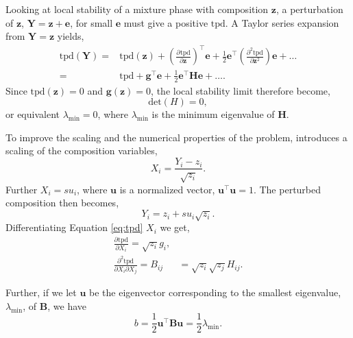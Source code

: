 \documentclass[english]{../thermomemo/thermomemo}
\newcommand*{\pd}[3][]{\frac{\partial^{#1}#2}{\partial{#3}^{#1}}}%
\newcommand*{\vektor}[1]{\boldsymbol{#1}}%
\newcommand{\wrpt}{\text{with respect to~}}
\newcommand{\tpd}{\ensuremath{\text{tpd}}\xspace}
\begin{document}
Looking at local stability of a mixture phase with composition $\vektor{z}$, a
perturbation of $\vektor{z}$, $\vektor{Y} = \vektor{z} + \vektor{e}$, for small $\vektor{e}$ must give a positive
\tpd. A Taylor series expansion from $\vektor{Y}=\vektor{z}$ yields,
\begin{align}
  \tpd(\vektor{Y}) =& \tpd(\vektor{z}) + \left(\pd{\tpd}{\vektor{z}}\right)^\intercal\vektor{e} + \frac{1}{2}\vektor{e}^\intercal\left(\pd[2]{\tpd}{\vektor{z}}\right)\vektor{e} + \dots \\
  =& \tpd + \vektor{g}^\intercal \vektor{e} + \frac{1}{2}\vektor{e}^\intercal\vektor{H}\vektor{e} + \dots.
  \label{eq:tpdTaylor}
\end{align}
Since $\tpd(\vektor{z}) = 0$ and $\vektor{g}(\vektor{z}) = 0$, the local stability limit therefore become,
\begin{equation}
  \text{det}\left(H\right) = 0,
  \label{eq:detM}
\end{equation}
or equivalent $\lambda_{\text{min}} = 0$, where $\lambda_{\text{min}}$
is the minimum eigenvalue of $\vektor{H}$.

To improve the scaling and the numerical properties of the problem,
\citet{Michelsen1984} introduces a scaling of the composition
variables,
\begin{equation}
  \label{eq:X}
  X_i = \frac{Y_i-z_i}{\sqrt{z_i}}.
\end{equation}
Further $X_i = s u_i$, where $\vektor{u}$ is a normalized vector,
$\vektor{u}^\intercal\vektor{u} = 1$. The perturbed composition then becomes,
\begin{equation}
  \label{eq:Y}
  Y_i = z_i + s u_i\sqrt{z_i}.
\end{equation}
Differentiating Equation \ref{eq:tpd} \wrpt $X_i$ we get,
\begin{align}
  \pd{\tpd}{X_i} = \sqrt{z_i}g_i,\\
  \frac{\partial^2\tpd}{\partial X_i \partial X_j} = B_{ij} &=  \sqrt{z_i}\sqrt{z_j}H_{ij}.
  \label{eq:dtpdX}
\end{align}

Further, if we let $\vektor{u}$ be the eigenvector corresponding to the smallest
eigenvalue, $\lambda_{\text{min}}$, of $\vektor{B}$, we have
\begin{equation}
  \label{eq:b}
  b = \frac{1}{2}\vektor{u}^{\top}\vektor{B}\vektor{u} = \frac{1}{2} \lambda_{\text{min}}.
\end{equation}
\end{document}
